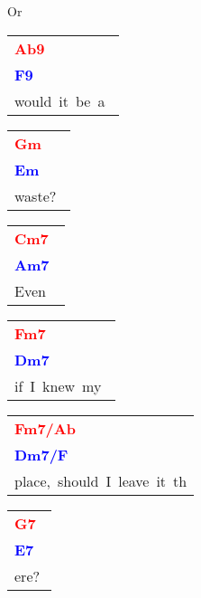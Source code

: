\documentclass[12pt,a4paper,openany,UTF8]{memoir}
\begin{document}
Or~\begin{tabular}[b]{l}
    \textbf{\textcolor{red}{Ab9\ }}\\\textbf{\textcolor{blue}{F9\ }}\\
    would~it~be~a~\mbox{}\end{tabular}\begin{tabular}[b]{l}
    \textbf{\textcolor{red}{Gm\ }}\\\textbf{\textcolor{blue}{Em\ }}\\
    waste?~\mbox{}\end{tabular}\begin{tabular}[b]{l}
    \textbf{\textcolor{red}{Cm7\ }}\\\textbf{\textcolor{blue}{Am7\ }}\\
    Even~\mbox{}\end{tabular}\begin{tabular}[b]{l}
    \textbf{\textcolor{red}{Fm7\ }}\\\textbf{\textcolor{blue}{Dm7\ }}\\
    if~I~knew~my~\mbox{}\end{tabular}\begin{tabular}[b]{l}
    \textbf{\textcolor{red}{Fm7/Ab\ }}\\\textbf{\textcolor{blue}{Dm7/F\ }}\\
    place,~should~I~leave~it~th\mbox{}\end{tabular}\begin{tabular}[b]{l}
    \textbf{\textcolor{red}{G7\ }}\\\textbf{\textcolor{blue}{E7\ }}\\
    ere?\mbox{}\end{tabular}\\
\end{document}
